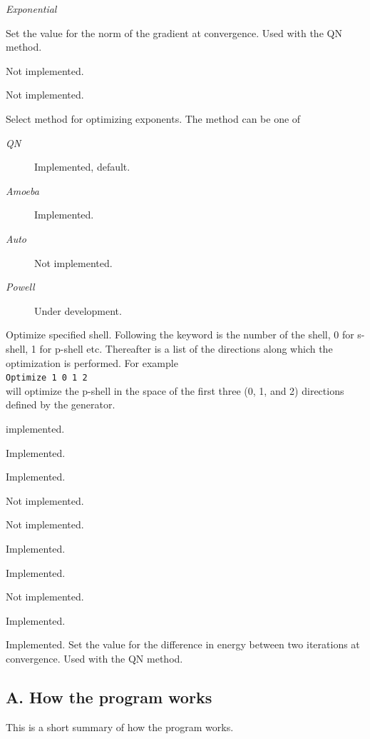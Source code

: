 \documentclass[a4paper,fleqn]{article}
\let\headi=\subsection
\def\kwd#1{{\mdseries\sffamily\slshape\mdseries #1}}
\def\kwditem[#1]{\item[\kwd{#1}]}
\begin{document}
\begin{description}
\begin{description}
  \kwditem[Exponential] %
  \end{description}
\kwditem[gThreshold]
  Set the value for the norm of the gradient at convergence. Used with the QN method.
\kwditem[Hessian] Not implemented.
\kwditem[LineSearch] Not implemented.
\kwditem[Method]
  Select method for optimizing exponents.
  The method can be one of
  \begin{description}
  \kwditem[QN] Implemented, default.
  \kwditem[Amoeba] Implemented.
  \kwditem[Auto] Not implemented.
  \kwditem[Powell] Under development.
  \end{description}
\kwditem[Optimize]
  Optimize specified shell. Following the keyword is the number of the shell, 0 for s-shell, 1 for p-shell etc.
  Thereafter is a list of the directions along which the optimization is performed.
  For example\\
  \verb+Optimize 1 0 1 2+\\
  will optimize the p-shell in the space of the first three (0, 1, and 2) directions
  defined by the generator.
\kwditem[OptimizeWithDirections] implemented.
\kwditem[Penalty] Implemented.
\kwditem[Print] Implemented.
\kwditem[PrintDirections] Not implemented.
\kwditem[Reorder] Not implemented.
\kwditem[SelectShell] Implemented.
\kwditem[PrintRaw] Implemented.
\kwditem[Sort] Not implemented.
\kwditem[Step] Implemented.
\kwditem[Threshold] Implemented.
  Set the value for the difference in energy between two iterations at convergence.
  Used with the QN method.
\end{description}
\headi{A. How the program works}
This is a short summary of how the program works.
\end{document}

